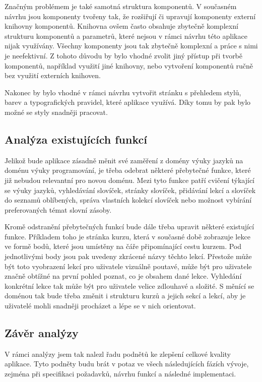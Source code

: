 Značným problémem je také samotná struktura komponentů. V současném návrhu jsou komponenty tvořeny tak, že rozšiřují či upravují komponenty externí knihovny komponentů. Knihovna ovšem často obsahuje zbytečně komplexní strukturu komponentů a parametrů, které nejsou v rámci návrhu této aplikace nijak využívány. Všechny komponenty jsou tak zbytečně komplexní a práce s nimi je neefektivní. Z tohoto důvodu by bylo vhodné zvolit jiný přístup při tvorbě komponentů, například využití jiné knihovny, nebo vytvoření komponentů ručně bez využití externích knihoven.

Nakonec by bylo vhodné v rámci návrhu vytvořit stránku s přehledem stylů, barev a typografických pravidel, které aplikace využívá. Díky tomu by pak bylo možné se styly snadněji pracovat.

\subsection{Analýza existujících funkcí}

Jelikož bude aplikace zásadně měnit své zaměření z domény výuky jazyků na doménu výuky programování, je třeba odebrat některé přebytečné funkce, které již nebudou relevantní pro novou doménu. Mezi tyto funkce patří cvičení týkající se výuky jazyků, vyhledávání slovíček, stránky slovíček, přidávání lekcí a slovíček do seznamů oblíbených, správa vlastních kolekcí slovíček nebo možnost vybírání preferovaných témat slovní zásoby.

Kromě odstranění přebytečných funkcí bude dále třeba upravit některé existující funkce. Příkladem toho je stránka kurzu, která v současné době zobrazuje lekce ve formě bodů, které jsou umístěny na čáře připomínající cestu kurzem. Pod jednotlivými body jsou pak uvedeny zkrácené názvy těchto lekcí. Přestože může být toto vyobrazení lekcí pro uživatele vizuálně poutavé, může být pro uživatele značně obtížné na první pohled poznat, co je obsahem dané lekce. Vyhledání konkrétní lekce tak může být pro uživatele velice zdlouhavé a složité. S měnící se doménou tak bude třeba změnit i strukturu kurzů a jejich sekcí a lekcí, aby je uživatelé mohli snadněji procházet a lépe se v nich orientovat.

\subsection{Závěr analýzy}

V rámci analýzy jsem tak nalezl řadu podnětů ke zlepšení celkové kvality aplikace. Tyto podněty budu brát v potaz ve všech následujících fázích vývoje, zejména při specifikaci požadavků, návrhu funkcí a následné implementaci.

